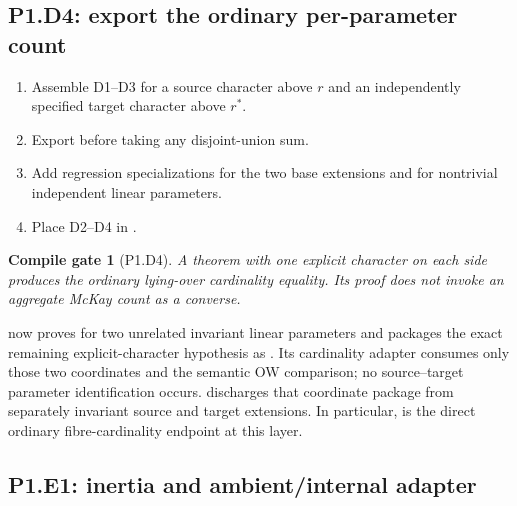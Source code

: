 \documentclass[11pt]{article}
\newtheorem{gate}{Compile gate}
\begin{document}
\subsection{P1.D4: export the ordinary per-parameter count}

\begin{enumerate}[label=\textbf{P1.D4.\arabic*.},leftmargin=*]
  \item Assemble D1--D3 for a source character above \(r\) and an
  independently specified target character above \(r^*\).
  \item Export
   before taking any
  disjoint-union sum.
  \item Add regression specializations for the two base extensions and for
  nontrivial independent linear parameters.
  \item Place D2--D4 in
  .
\end{enumerate}

\begin{gate}[P1.D4]
A theorem with one explicit character on each side produces the ordinary
lying-over cardinality equality.  Its proof does not invoke an aggregate
McKay count as a converse.
\end{gate}

 now proves
 for two unrelated
invariant linear parameters and packages the exact remaining
explicit-character hypothesis as
.  Its
cardinality adapter consumes only those two coordinates and the semantic
OW comparison; no source--target parameter identification occurs.
 discharges that
coordinate package from separately invariant source and target
extensions.  In particular,
 is the direct
ordinary fibre-cardinality endpoint at this layer.

\subsection{P1.E1: inertia and ambient/internal adapter}
\end{document}
